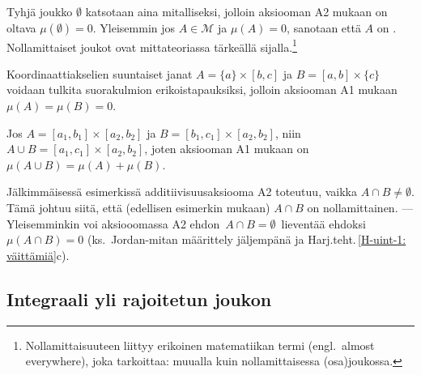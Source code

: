 Tyhjä joukko $\emptyset$ katsotaan aina mitalliseksi, jolloin aksiooman A2 mukaan on oltava
$\mu(\emptyset)=0$. Yleisemmin jos $A \in \mathcal{M}$ ja $\mu(A)=0$, sanotaan että $A$ on
%
. Nollamittaiset joukot ovat mittateoriassa tärkeällä
sijalla.\footnote[2]{Nollamittaisuuteen liittyy erikoinen matematiikan termi
 (engl.\ almost everywhere), joka tarkoittaa: muualla kuin
nollamittaisessa (osa)joukossa. }
\begin{Exa} Koordinaattiakselien suuntaiset janat $A=\{a\}\times[b,c]$ ja
$B=[a,b]\times\{c\}$ voidaan tulkita suorakulmion erikoistapauksiksi, jolloin aksiooman A1
mukaan $\mu(A)=\mu(B)=0$. \loppu
\end{Exa}
\begin{Exa} Jos $A=[a_1,b_1]\times[a_2,b_2]$ ja $B=[b_1,c_1]\times[a_2,b_2]$, niin
$A \cup B=[a_1,c_1]\times[a_2,b_2]$, joten aksiooman A1 mukaan on
$\mu(A \cup B)=\mu(A)+\mu(B)$. \loppu
\end{Exa}
Jälkimmäisessä esimerkissä additiivisuusaksiooma A2 toteutuu, vaikka $A \cap B\neq\emptyset$.
Tämä johtuu siitä, että (edellisen esimerkin mukaan) $A \cap B$ on nollamittainen.
--- Yleisemminkin voi aksiooomassa A2 ehdon $\,A \cap B = \emptyset\,$ lieventää ehdoksi
$\mu(A \cap B)=0$ (ks.\ Jordan-mitan määrittely jäljempänä ja
Harj.teht.\,\ref{H-uint-1: väittämiä}c).

\subsection{Integraali yli rajoitetun joukon}

